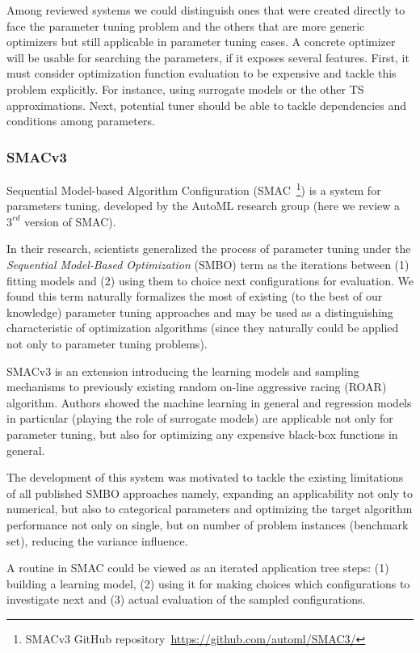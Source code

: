 Among reviewed systems we could distinguish ones that were created directly to face the parameter tuning problem and the others that are more generic optimizers but still applicable in parameter tuning cases.
A concrete optimizer will be usable for searching the parameters, if it exposes several features. First, it must consider optimization function evaluation to be expensive and tackle this problem explicitly. For instance, using surrogate models or the other TS approximations. Next, potential tuner should be able to tackle dependencies and conditions among parameters.

\subsubsection{SMACv3~\cite{hutter2011sequential}}\label{bg: smac}
Sequential Model-based Algorithm Configuration (SMAC~\footnote{SMACv3 GitHub repository~\url{https://github.com/automl/SMAC3/}}) is a system for parameters tuning, developed by the AutoML research group (here we review a $3^{rd}$ version of SMAC). 

In their research, scientists generalized the process of parameter tuning under the  \emph{Sequential Model-Based Optimization} (SMBO) term as the iterations between (1) fitting models and (2) using them to choice next configurations for evaluation. 
We found this term naturally formalizes the most of existing (to the best of our knowledge) parameter tuning approaches and may be used as a distinguishing characteristic of optimization algorithms (since they naturally could be applied not only to parameter tuning problems).

SMACv3 is an extension introducing the learning models and sampling mechanisms to previously existing random on-line aggressive racing (ROAR) algorithm. Authors showed the machine learning in general and regression models in particular (playing the role of surrogate models) are applicable not only for parameter tuning, but also for optimizing any expensive black-box functions in general. 

The development of this system was motivated to tackle the existing limitations of all published SMBO approaches namely, expanding an applicability not only to numerical, but also to categorical parameters and optimizing the target algorithm performance not only on single, but on number of problem instances (benchmark set), reducing the variance influence.

A routine in SMAC could be viewed as an iterated application tree steps: (1) building a learning model, (2) using it for making choices which configurations to investigate next and (3) actual evaluation of the sampled configurations.

